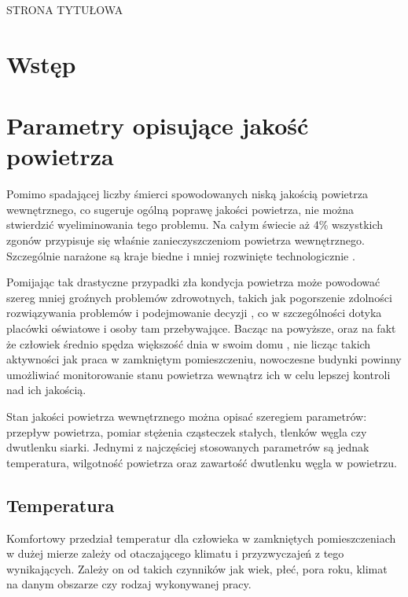\documentclass[a4paper, 12pt]{article}
\begin{document}
\vspace*{\fill}

\begin{center}
    STRONA TYTUŁOWA
\end{center}

\vspace*{\fill}

\newpage

\section{Wstęp}

\section{Parametry opisujące jakość powietrza}

Pomimo spadającej liczby śmierci spowodowanych niską jakością powietrza 
wewnętrznego, co sugeruje ogólną poprawę jakości powietrza, nie można 
stwierdzić wyeliminowania tego problemu. Na całym świecie aż 4\% wszystkich 
zgonów przypisuje się właśnie zanieczyszczeniom powietrza wewnętrznego. 
Szczególnie narażone są kraje biedne i mniej rozwinięte technologicznie \cite{owid}.

Pomijając tak drastyczne przypadki zła kondycja powietrza może powodować szereg mniej 
groźnych problemów zdrowotnych, takich jak pogorszenie zdolności rozwiązywania 
problemów i podejmowanie decyzji \cite{co2-effects}, co w szczególności dotyka placówki oświatowe i 
osoby tam przebywające. Bacząc na powyższe, oraz na fakt że człowiek średnio spędza większość dnia w swoim 
domu \cite{time-indoors}, nie licząc takich aktywności jak praca w zamkniętym pomieszczeniu, nowoczesne 
budynki powinny umożliwiać monitorowanie stanu powietrza wewnątrz 
ich w celu lepszej kontroli nad ich jakością.

Stan jakości powietrza wewnętrznego można opisać szeregiem parametrów: przepływ powietrza, 
pomiar stężenia cząsteczek stałych, tlenków węgla czy dwutlenku siarki. Jednymi z 
najczęściej stosowanych parametrów są jednak temperatura, wilgotność powietrza oraz 
zawartość dwutlenku węgla w powietrzu. 

\subsection{Temperatura}

Komfortowy przedział temperatur dla człowieka w zamkniętych pomieszczeniach w dużej 
mierze zależy od otaczającego klimatu i przyzwyczajeń z tego wynikających. Zależy on od takich czynników 
jak wiek, płeć, pora roku, klimat na danym obszarze czy rodzaj wykonywanej pracy.
\end{document}
